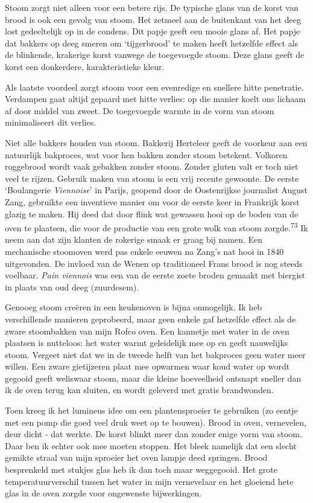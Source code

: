 \documentclass[
  11pt,
  dutch,
]{memoir}
\begin{document}
Stoom zorgt niet alleen voor een betere rijs. De typische glans van de
korst van brood is ook een gevolg van stoom. Het zetmeel aan de
buitenkant van het deeg lost gedeeltelijk op in de condens. Dit papje
geeft een mooie glans af. Het papje dat bakkers op deeg smeren om
`tijgerbrood' te maken heeft hetzelfde effect als de blinkende,
krakerige korst vanwege de toegevoegde stoom. Deze glans geeft de korst
een donkerdere, karakteristieke kleur.

Als laatste voordeel zorgt stoom voor een evenredige en snellere hitte
penetratie. Verdampen gaat altijd gepaard met hitte verlies: op die
manier koelt ons lichaam af door middel van zweet. De toegevoegde warmte
in de vorm van stoom minimaliseert dit verlies.

Niet alle bakkers houden van stoom. Bakkerij Herteleer geeft de voorkeur
aan een natuurlijk bakproces, wat voor hen bakken zonder stoom betekent.
Volkoren roggebrood wordt vaak gebakken zonder stoom. Zonder gluten valt
er toch niet veel te rijzen. Gebruik maken van stoom is een vrij recente
gewoonte. De eerste `Boulangerie \emph{Viennoise}' in Parijs, geopend
door de Oostenrijkse journalist August Zang, gebruikte een inventieve
manier om voor de eerste keer in Frankrijk korst glazig te maken. Hij
deed dat door flink wat gewassen hooi op de boden van de oven te
plaatsen, die voor de productie van een grote wolk van stoom
zorgde.\textsuperscript{73} Ik neem aan dat zijn klanten de rokerige
smaak er graag bij namen. Een mechanische stoomoven werd pas enkele
eeuwen na Zang's nat hooi in 1840 uitgevonden. De invloed van de Wenen
op traditioneel Frans brood is nog steeds voelbaar. \emph{Pain viennois}
was een van de eerste zoete broden gemaakt met biergist in plaats van
oud deeg (zuurdesem).

Genooeg stoom creëren in een keukenoven is bijna onmogelijk. Ik heb
verschillende manieren geprobeerd, maar geen enkele gaf hetzelfde effect
als de zware stoombakken van mijn Rofco oven. Een kannetje met water in
de oven plaatsen is nutteloos: het water warmt geleidelijk mee op en
geeft nauwelijks stoom. Vergeet niet dat we in de tweede helft van het
bakproces geen water meer willen. Een zware gietijzeren plaat mee
opwarmen waar koud water op wordt gegooid geeft weliswaar stoom, maar
die kleine hoeveelheid ontsnapt sneller dan ik de oven terug kan
sluiten, en wordt geleverd met gratis brandwonden.

Toen kreeg ik het lumineus idee om een plantensproeier te gebruiken (zo
eentje met een pomp die goed veel druk weet op te bouwen). Brood in
oven, vernevelen, deur dicht - dat werkte. De korst blinkt meer dan
zonder enige vorm van stoom. Daar ben ik echter ook mee moeten stoppen.
Het bleek namelijk dat een slecht gemikte straal van mijn sproeier het
oven lampje deed springen. Brood besprenkeld met stukjes glas heb ik dan
toch maar weggegooid. Het grote temperatuurverschil tussen het water in
mijn vernevelaar en het gloeiend hete glas in de oven zorgde voor
ongewenste bijwerkingen.
\end{document}
